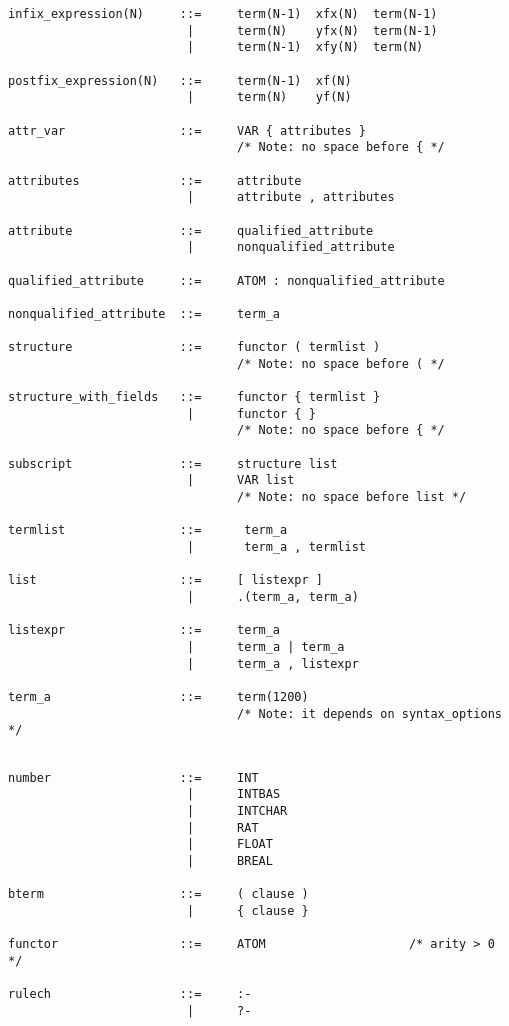 \begin{verbatim}
infix_expression(N)     ::=     term(N-1)  xfx(N)  term(N-1)
                         |      term(N)    yfx(N)  term(N-1)
                         |      term(N-1)  xfy(N)  term(N)

postfix_expression(N)   ::=     term(N-1)  xf(N)
                         |      term(N)    yf(N)

attr_var                ::=     VAR { attributes }
                                /* Note: no space before { */

attributes              ::=     attribute
                         |      attribute , attributes

attribute               ::=     qualified_attribute
                         |      nonqualified_attribute

qualified_attribute     ::=     ATOM : nonqualified_attribute

nonqualified_attribute  ::=     term_a

structure               ::=     functor ( termlist )
                                /* Note: no space before ( */

structure_with_fields   ::=     functor { termlist }
                         |      functor { }
                                /* Note: no space before { */

subscript               ::=     structure list
                         |      VAR list
                                /* Note: no space before list */

termlist                ::=      term_a
                         |       term_a , termlist

list                    ::=     [ listexpr ]
                         |      .(term_a, term_a)

listexpr                ::=     term_a
                         |      term_a | term_a
                         |      term_a , listexpr

term_a                  ::=     term(1200)
                                /* Note: it depends on syntax_options */

\end{verbatim}
\vfill\pagebreak %
\begin{verbatim}

number                  ::=     INT
                         |      INTBAS
                         |      INTCHAR
                         |      RAT
                         |      FLOAT
                         |      BREAL

bterm                   ::=     ( clause )
                         |      { clause }

functor                 ::=     ATOM                    /* arity > 0 */

rulech                  ::=     :-
                         |      ?-
\end{verbatim}



